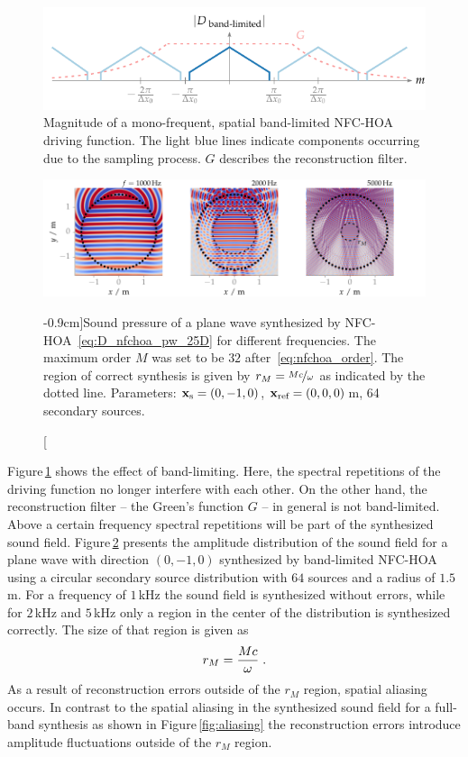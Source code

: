 \begin{figure}
    \includegraphics{fig3_10/fig3_10}
    \caption{Magnitude of a mono-frequent, spatial band-limited \ac{NFC-HOA}
    driving function.
    The light blue lines
    indicate components occurring due to the sampling process. $G$ describes the
    reconstruction filter.
    }
    \label{fig:sampling_band_limited}
\end{figure}
%
\begin{figure}[b]
    \includegraphics{fig3_11/fig3_11}
    \caption[][-0.9cm]{Sound pressure of a plane wave synthesized by
    \ac{NFC-HOA}~\protect\eqref{eq:D_nfchoa_pw_25D} for different frequencies.
    The maximum order $M$ was set
    to be $32$ after~\protect\eqref{eq:nfchoa_order}. The region of correct synthesis is
    given by $r_M = \nicefrac{Mc}{\omega}$ as indicated by the dotted line.
    Parameters: $\mathbf{x}_\text{s} = (0,-1,0)$, $\mathbf{x}_\text{ref} = (0,0,0)$\,m, 64
    secondary sources.
    }
    \label{fig:nfchoa_aliasing}
\end{figure}
%
Figure\,\ref{fig:sampling_band_limited} shows the effect of band-limiting.
Here, the spectral repetitions of the driving
function no longer interfere with each other. On the other hand, the reconstruction
filter -- the Green's function $G$ -- 
in general is not band-limited. Above a certain frequency spectral repetitions
will be part of the synthesized sound field. Figure\,\ref{fig:nfchoa_aliasing}
presents the amplitude distribution of the sound field for a plane wave with
direction $(0,-1,0)$ synthesized by
\twohalfD band-limited \ac{NFC-HOA} using a circular secondary source distribution with
$64$ sources and a radius of $1.5$\,m. For a frequency of $1$\,kHz the sound field
is synthesized without errors, while for $2$\,kHz and $5$\,kHz only a region in the
center of the distribution is synthesized correctly. The size of that region is
given as\autocite[Compare (9.1.31) and Fig.\,9.5 of][]{Gumerov2004}
%
\begin{equation}
    r_M = \frac{Mc}{\omega} \qp
    \label{eq:rM}
\end{equation}
%
As a result of reconstruction errors outside of the $r_M$ region, spatial aliasing occurs.
In contrast to the spatial aliasing in the synthesized sound field for a
full-band synthesis as shown in Figure\,\ref{fig:aliasing} the reconstruction errors
introduce amplitude fluctuations outside of the $r_M$ region.

